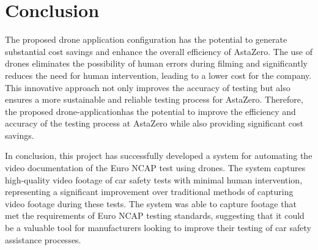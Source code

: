 \chapter{Conclusion}



The proposed drone application configuration has the potential to generate substantial cost savings and enhance the overall efficiency of AstaZero. The use of drones eliminates the possibility of human errors during filming and significantly reduces the need for human intervention, leading to a lower cost for the company. This innovative approach not only improves the accuracy of testing but also ensures a more sustainable and reliable testing process for AstaZero. Therefore, the proposed drone-applicationhas the potential to improve the efficiency and accuracy of the testing process at AstaZero while also providing significant cost savings. \newline

In conclusion, this project has successfully developed a system for automating the video documentation of the  Euro NCAP test  using drones. The system captures high-quality video footage of car safety tests with minimal human intervention, representing a significant improvement over traditional methods of capturing video footage during these tests. The system was able to capture footage that met the requirements of Euro NCAP testing standards, suggesting that it could be a valuable tool for manufacturers looking to improve their testing of car safety assistance processes. \newline

